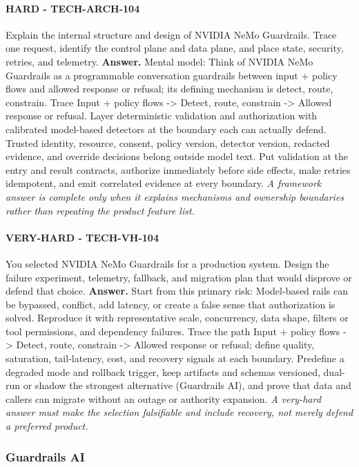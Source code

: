 \paragraph{HARD - TECH-ARCH-104} Explain the internal structure and design of NVIDIA NeMo Guardrails. Trace one request, identify the control plane and data plane, and place state, security, retries, and telemetry.
\textbf{Answer.} Mental model: Think of NVIDIA NeMo Guardrails as a programmable conversation guardrails between input + policy flows and allowed response or refusal; its defining mechanism is detect, route, constrain. Trace Input + policy flows -> Detect, route, constrain -> Allowed response or refusal. Layer deterministic validation and authorization with calibrated model-based detectors at the boundary each can actually defend. Trusted identity, resource, consent, policy version, detector version, redacted evidence, and override decisions belong outside model text. Put validation at the entry and result contracts, authorize immediately before side effects, make retries idempotent, and emit correlated evidence at every boundary.
\textit{A framework answer is complete only when it explains mechanisms and ownership boundaries rather than repeating the product feature list.}
\paragraph{VERY-HARD - TECH-VH-104} You selected NVIDIA NeMo Guardrails for a production system. Design the failure experiment, telemetry, fallback, and migration plan that would disprove or defend that choice.
\textbf{Answer.} Start from this primary risk: Model-based rails can be bypassed, conflict, add latency, or create a false sense that authorization is solved. Reproduce it with representative scale, concurrency, data shape, filters or tool permissions, and dependency failures. Trace the path Input + policy flows -> Detect, route, constrain -> Allowed response or refusal; define quality, saturation, tail-latency, cost, and recovery signals at each boundary. Predefine a degraded mode and rollback trigger, keep artifacts and schemas versioned, dual-run or shadow the strongest alternative (Guardrails AI), and prove that data and callers can migrate without an outage or authority expansion.
\textit{A very-hard answer must make the selection falsifiable and include recovery, not merely defend a preferred product.}
\subsubsection*{Guardrails AI}
